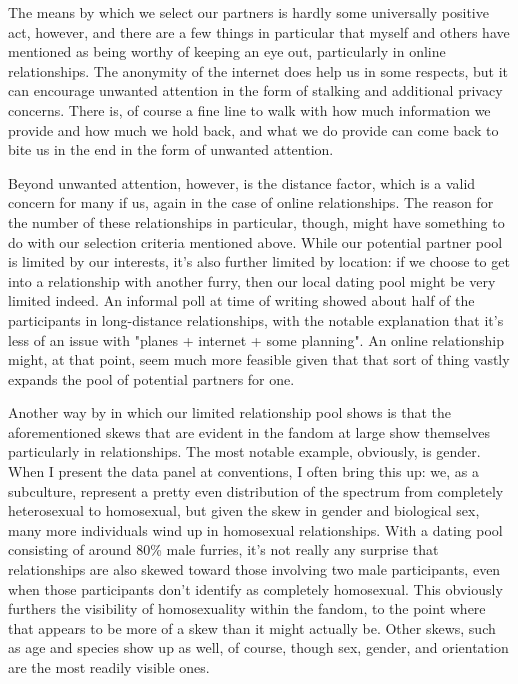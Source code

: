 The means by which we select our partners is hardly some universally positive act, however, and there are a few things in particular that myself and others have mentioned as being worthy of keeping an eye out, particularly in online relationships. The anonymity of the internet does help us in some respects, but it can encourage unwanted attention in the form of stalking and additional privacy concerns. There is, of course a fine line to walk with how much information we provide and how much we hold back, and what we do provide can come back to bite us in the end in the form of unwanted attention.

Beyond unwanted attention, however, is the distance factor, which is a valid concern for many if us, again in the case of online relationships. The reason for the number of these relationships in particular, though, might have something to do with our selection criteria mentioned above. While our potential partner pool is limited by our interests, it's also further limited by location: if we choose to get into a relationship with another furry, then our local dating pool might be very limited indeed. An informal poll at time of writing showed about half of the participants in long-distance relationships, with the notable explanation that it's less of an issue with "planes + internet + some planning". An online relationship might, at that point, seem much more feasible given that that sort of thing vastly expands the pool of potential partners for one.

Another way by in which our limited relationship pool shows is that the aforementioned skews that are evident in the fandom at large show themselves particularly in relationships. The most notable example, obviously, is gender. When I present the data panel at conventions, I often bring this up: we, as a subculture, represent a pretty even distribution of the spectrum from completely heterosexual to homosexual, but given the skew in gender and biological sex, many more individuals wind up in homosexual relationships. With a dating pool consisting of around 80\% male furries, it's not really any surprise that relationships are also skewed toward those involving two male participants, even when those participants don't identify as completely homosexual. This obviously furthers the visibility of homosexuality within the fandom, to the point where that appears to be more of a skew than it might actually be. Other skews, such as age and species show up as well, of course, though sex, gender, and orientation are the most readily visible ones.

